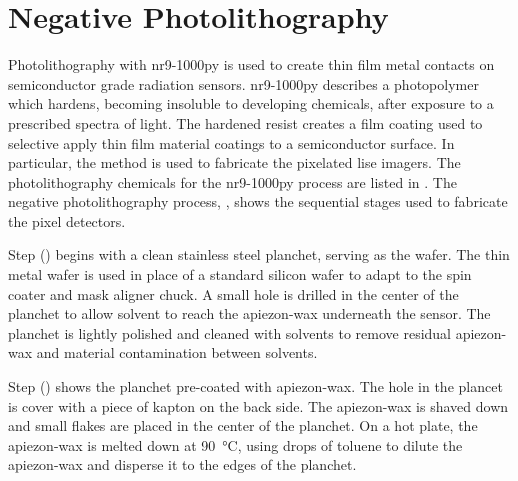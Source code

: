 \documentclass[../../main.tex]{subfiles}
\begin{document}
%
    \section{Negative Photolithography}%
    \label{app:thin-film-processing:negative-photolithography}%
    Photolithography with \gls{nr9-1000py} is used to create thin film metal contacts on semiconductor grade radiation sensors.
    \Gls{nr9-1000py} describes a photopolymer which hardens, becoming insoluble to developing chemicals, after exposure to a prescribed spectra of light.
    The hardened resist creates a film coating used to selective apply thin film material coatings to a semiconductor surface.
    In particular, the method is used to fabricate the pixelated \gls{lise} imagers.
    The photolithography chemicals for the \gls{nr9-1000py} process are listed in .
    The negative photolithography process, , shows the sequential stages used to fabricate the pixel detectors.
    \par%
    Step () begins with a clean stainless steel planchet, serving as the wafer.
    The thin metal wafer is used in place of a standard silicon wafer to adapt to the spin coater and mask aligner chuck.
    A small hole is drilled in the center of the planchet to allow solvent to reach the \gls{apiezon-wax} underneath the sensor.
    The planchet is lightly polished and cleaned with solvents to remove residual \gls{apiezon-wax} and material contamination between solvents.
    \par%
    Step () shows the planchet pre-coated with \gls{apiezon-wax}.
    The hole in the plancet is cover with a piece of \gls{kapton} on the back side.
    The \gls{apiezon-wax} is shaved down and small flakes are placed in the center of the planchet.
    On a hot plate, the \gls{apiezon-wax} is melted down at \SI{90}{\celsius}, using drops of \gls{toluene} to dilute the \gls{apiezon-wax} and disperse it to the edges of the planchet.
\end{document}
